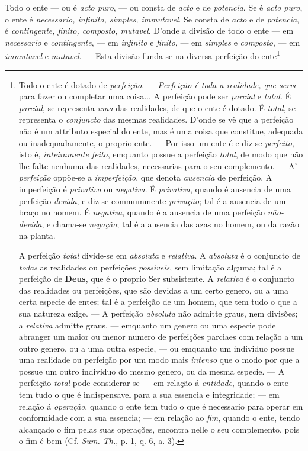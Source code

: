  Todo o ente --- ou é \emph{acto puro}, --- ou consta de
\emph{acto} e de \emph{potencia}. Se é \emph{acto puro}, o ente é \emph{necessario,
infinito, simples, immutavel}. Se consta de \emph{acto} e de \emph{potencia}, é
\emph{contingente, finito, composto, mutavel}. D'onde a divisão de todo o ente --- em
\emph{necessario} e \emph{contingente}, --- em \emph{infinito} e \emph{finito}, --- em
\emph{simples} e \emph{composto}, --- em \emph{immutavel} e \emph{mutavel}. --- Esta
divisão funda-se na diversa perfeição do ente\footnote{Todo o ente é dotado de
\emph{perfeição}. --- \emph{Perfeição é toda a realidade, que serve} para fazer ou
completar uma coisa... A perfeição pode ser \emph{parcial} e \emph{total}. É
\emph{parcial}, se representa \emph{uma} das realidades, de que o ente é dotado. É
\emph{total}, se representa o \emph{conjuncto} das mesmas realidades. D'onde se vê que a
perfeição não é um attributo especial do ente, mas é uma coisa que constitue, adequada ou
inadequadamente, o proprio ente. --- Por isso um ente é e diz-se \emph{perfeito}, isto é,
\emph{inteiramente feito}, emquanto possue a perfeição \emph{total}, de modo que não lhe
falte nenhuma das realidades, necessarias para o seu complemento. --- A' \emph{perfeição}
oppõe-se a \emph{imperfeição}, que denota \emph{ausencia} de perfeição. A imperfeição é
\emph{privativa} ou \emph{negativa}. É \emph{privativa}, quando é ausencia de uma
perfeição \emph{devida}, e diz-se commummente \emph{privação}; tal é a ausencia de um
braço no homem. É \emph{negativa}, quando é a ausencia de uma perfeição
\emph{não-devida}, e chama-se \emph{negação}; tal é a ausencia das azas no homem, ou da
razão na planta.

A perfeição \emph{total} divide-se em \emph{absoluta} e \emph{relativa}. A
\emph{absoluta} é o conjuncto de \emph{todas} as realidades ou perfeições
\emph{possiveis}, sem limitação alguma; tal é a perfeição de \textbf{Deus}, que é o
proprio Ser subsistente. A \emph{relativa} é o conjuncto das realidades ou perfeições,
que são devidas a um certo genero, ou a uma certa especie de entes; tal é a perfeição de
um homem, que tem tudo o que a sua natureza exige. --- A perfeição \emph{absoluta} não
admitte graus, nem divisões; a \emph{relativa} admitte graus, --- emquanto um genero ou
uma especie pode abranger um maior ou menor numero de perfeições parciaes com relação a
um outro genero, ou a uma outra especie, --- ou emquanto um individuo possue uma
realidade ou perfeição por um modo mais \emph{intenso} que o modo por que a possue um
outro individuo do mesmo genero, ou da mesma especie. --- A perfeição \emph{total} pode
considerar-se --- em relação á \emph{entidade}, quando o ente tem tudo o que é
indispensavel para a sua essencia e integridade; --- em relação á \emph{operação},
quando o ente tem tudo o que é necessario para operar em conformidade com a sua
essencia; --- em relação ao \emph{fim}, quando o ente, tendo alcançado o fim pelas suas
operações, encontra nelle o seu complemento, pois o fim é bem (Cf. \emph{Sum. Th.}, p.
1, q. 6, a. 3).

}

